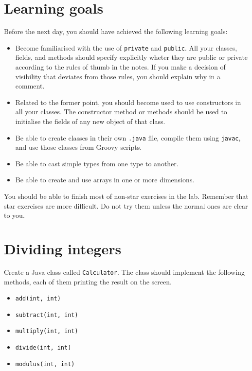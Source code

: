 \documentclass{article}
\begin{document}
\section*{Learning goals}
\label{sec:learning-goals}

Before the next day, you should have achieved the following learning
goals: 

\begin{itemize}
\item Become familiarised with the use of \verb+private+ and
  \verb+public+. All your classes, fields, and methods should specify
  explicitly wheter they are public or private according to the rules
  of thumb in the notes. If you make a decision of visibility that
  deviates from those rules, you should explain why in a comment.
\item Related to the former point, you should become used to use
  constructors in all your classes. The constructor method or methods
  should be used to initialise the fields of any new object of that
  class.
\item Be able to create classes in their own \verb+.java+ file, 
  compile them using
  \verb+javac+, and use those classes from Groovy scripts.
\item Be able to cast simple types from one type to another.
\item Be able to create and use arrays in one or more dimensions. 
\end{itemize}

You should be able to finish most of non-star exercises in the
lab. Remember that star exercises are more difficult. Do not try them
unless the normal ones are clear to you. 

\section{Dividing integers}
\label{sec:casting}

Create a Java class called \verb+Calculator+. The class should
implement the following methods, each of them printing the result on
the screen. 

\begin{itemize}
\item \verb+add(int, int)+
\item \verb+subtract(int, int)+
\item \verb+multiply(int, int)+
\item \verb+divide(int, int)+
\item \verb+modulus(int, int)+
\end{itemize}
\end{document}
